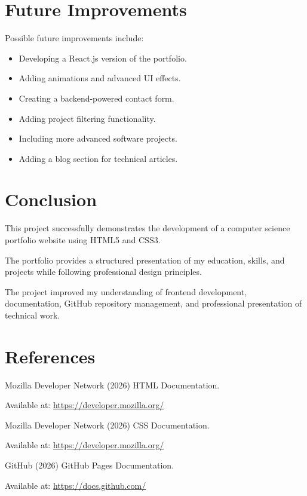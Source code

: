 \documentclass[12pt,a4paper]{article}
\begin{document}
\section{Future Improvements}


Possible future improvements include:


\begin{itemize}


\item Developing a React.js version of the portfolio.

\item Adding animations and advanced UI effects.

\item Creating a backend-powered contact form.

\item Adding project filtering functionality.

\item Including more advanced software projects.

\item Adding a blog section for technical articles.


\end{itemize}





\section{Conclusion}


This project successfully demonstrates the development of a computer science portfolio website using HTML5 and CSS3.

The portfolio provides a structured presentation of my education, skills, and projects while following professional design principles.

The project improved my understanding of frontend development, documentation, GitHub repository management, and professional presentation of technical work.



\section{References}


Mozilla Developer Network (2026) HTML Documentation.

Available at:
\url{https://developer.mozilla.org/}



Mozilla Developer Network (2026) CSS Documentation.

Available at:
\url{https://developer.mozilla.org/}



GitHub (2026) GitHub Pages Documentation.

Available at:
\url{https://docs.github.com/}
\end{document}
